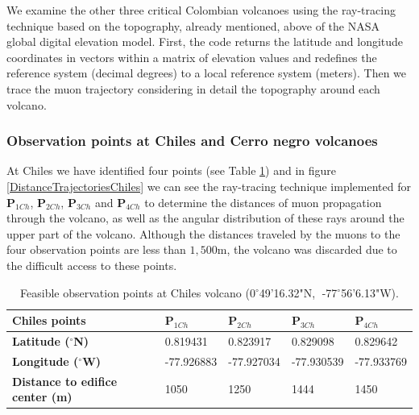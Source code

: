 \documentclass[letterpaper,10pt,titlepage,linenumber]{article}
\begin{document}
We examine the other three critical Colombian volcanoes using the ray-tracing technique based on the topography, already mentioned, above of the NASA global digital elevation model. First, the code returns the latitude and longitude coordinates in vectors within a matrix of elevation values and redefines the reference system (decimal degrees) to a local reference system (meters). Then we trace the muon trajectory considering in detail the topography around each volcano\cite{VesgaENG2018}.

\subsubsection{Observation points at Chiles and Cerro negro volcanoes}
At Chiles we have identified four points  (see Table \ref{TableChiles}) and in figure \ref{DistanceTrajectoriesChiles} we can see the ray-tracing technique implemented for {\bf P$_{1Ch}$}, {\bf P$_{2Ch}$}, {\bf P$_{3Ch}$} and {\bf P$_{4Ch}$} to determine the distances of muon propagation through the volcano, as well as the angular distribution of these rays around the upper part of the volcano. Although the distances traveled by the muons to the four observation points are less than $1,500$m, the volcano was discarded due to the difficult access to these points. 

\label{ChilesObservationPoints}
\begin{table}[!ht]
\centering
\begin{tabular}{lllll}
\hline
\textbf{Chiles points}        & \textbf{P$_{1Ch}$}& \textbf{P$_{2Ch}$} & \textbf{P$_{3Ch}$} & \textbf{P$_{4Ch}$} \\ \hline
\textbf{Latitude  ($^{\circ}$N)}        & 0.819431           & 0.823917         & 0.829098        & 0.829642     \\
\textbf{Longitude ($^{\circ}$W)}        & -77.926883         & -77.927034       & -77.930539       & -77.933769    \\
\textbf{Distance to edifice center (m)} & 1050               & 1250              & 1444              & 1450       \\ 
\hline
\end{tabular}
	\caption{Feasible observation points at Chiles volcano (0$^{\circ}$49'16.32"N,$\;$ -77$^{\circ}$56'6.13"W). }
\label{TableChiles}
\end{table}
\end{document}
